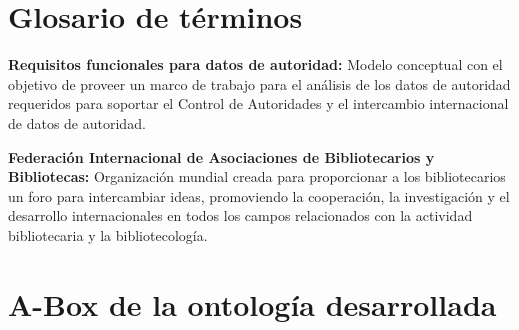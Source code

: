 \renewcommand{\appendixname}{\large Anexo}
\appendix

\chapter{\large Glosario de términos}
\pagestyle{fancy}
\lhead{}
\chead{}
\rhead{}
\lfoot{}
\cfoot{}
\rfoot{\thepage}
\renewcommand{\headrulewidth}{0.4pt}
\vspace{-1cm}

\textbf{Requisitos funcionales para datos de autoridad:} Modelo conceptual con el objetivo de proveer un marco de trabajo para el análisis de los datos de autoridad requeridos para soportar el Control de Autoridades y el intercambio internacional de datos de autoridad.

\textbf{Federación Internacional de Asociaciones de Bibliotecarios y Bibliotecas:} Organización mundial creada para proporcionar a los bibliotecarios un foro para intercambiar ideas, promoviendo la cooperación, la investigación y el desarrollo internacionales en todos los campos relacionados con la actividad bibliotecaria y la bibliotecología.


\chapter{\large A-Box de la ontología desarrollada}

\pagestyle{fancy}
\lhead{}
\chead{}
\rhead{}
\lfoot{}
\cfoot{}
\rfoot{\thepage}
\renewcommand{\headrulewidth}{0.4pt}
\vspace{-1cm}


